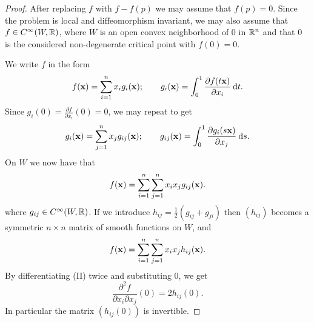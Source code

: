\begin{proof}
  After replacing $f$ with $f - f(p)$ we may assume that $f(p) = 0$. Since
the problem is local and diffeomorphism invariant, we may also assume that
$f\in C^\infty(W, {\mathbb{R}})$, where $W$ is an open convex neighborhood of 0 in ${\mathbb{R}}^n$ and that 0
is the considered non-degenerate critical point with $f(0) = 0$.

We write $f$ in the form
\[
  f(\F x) = \sum_{i=1}^{n }{x_i g_i(\F x)};\qquad g_i(\F x) = \int_0^1 \frac{\partial f(t\F x)}{\partial x_i}\dd t.
\]
Since $g_i(0) = \frac{\partial f }{\partial x_i}(0) = 0$, we may repeat to get 
\[
  g_i(\F x) = \sum_{j=1}^{n }{x_j g_{ij}(\F x)};\qquad 
  g_{ij}(\F x) = \int_0^1 \frac{\partial g_i(s\F x)}{\partial x_j}\dd s.
\]
On $W$ we now have that 
\[
  f(\mathbf{x}) = \sum_{i=1}^{n }{\sum_{j=1}^{n }{x_ix_j g_{ij}(\mathbf{x})}}.
\]
where $g_{ij}\in C^\infty(W, {\mathbb{R}})$. If we introduce $h_{ij}=\frac12(g_{ij}+g_{ji})$ then $(h_{ij})$ becomes 
a symmetric $n\times n$ matrix of smooth functions on $W$, and 
\begin{align}\label{eq:12-11}
  f(\mathbf{x}) = \sum_{i=1}^{n }{\sum_{j=1}^{n }{x_ix_j h_{ij}(\mathbf{x})}}.
\end{align}
By differentiating (II) twice and substituting 0, we get
\[
  \frac{\partial^2 f}{\partial x_i\partial x_j}(0) = 2h_{ij}(0).
\]
In particular the matrix $(h_{ij}(0))$ is invertible.


\end{proof}
